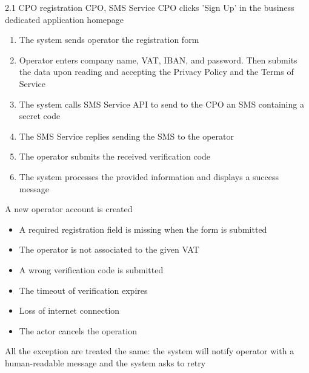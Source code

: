 \usecase
{
}
{2.1}
{CPO registration} %
{CPO, SMS Service} %
{CPO clicks 'Sign Up' in the business dedicated application homepage} %
{ %
    \begin{enumerate}
        \item The system sends operator the registration form
        \item Operator enters company name, VAT, IBAN, and password. Then submits the data upon reading and accepting the Privacy Policy and the Terms of Service
        \item The system calls SMS Service API to send to the CPO an SMS containing a secret code
        \item The SMS Service replies sending the SMS to the operator
        \item The operator submits the received verification code
        \item The system processes the provided information and displays a success message
    \end{enumerate}
}
{A new operator account is created} %
{ %
    \begin{itemize}
        \item A required registration field is missing when the form is submitted
        \item The operator is not associated to the given VAT
        \item A wrong verification code is submitted
        \item The timeout of verification expires
        \item Loss of internet connection
        \item The actor cancels the operation
    \end{itemize}
}
{ %
    All the exception are treated the same: the system will notify operator with a human-readable message and the system asks to retry
}

